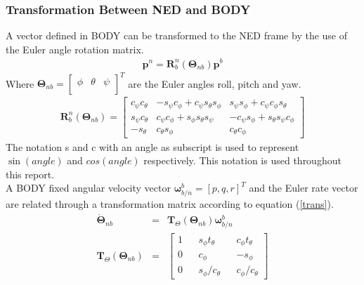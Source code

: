 \subsubsection{Transformation Between NED and BODY}
A vector defined in BODY can be transformed to the NED frame by the use of the Euler angle rotation matrix.
\begin{eqnarray}
\boldsymbol{p}^n = \boldsymbol{R}_b^n(\boldsymbol{\Theta}_{nb})\boldsymbol{p}^b
\end{eqnarray}
Where $\boldsymbol{\Theta}_{nb} = \begin{bmatrix}
\phi & \theta & \psi\\
\end{bmatrix}^T$ are the Euler angles roll, pitch and yaw. 
\begin{eqnarray}
\boldsymbol{R} _b^n(\boldsymbol{\Theta}_{nb}) = 
\begin{bmatrix}
c_\psi c_\theta & -s_\psi c_\phi + c_\psi s_\theta s_\phi & s_\psi s_\phi + c_\psi c_\phi s_\theta\\
s_\psi c_\theta & c_\psi c_\phi + s_\phi s_\theta s_\psi & -c_\psi s_\phi + s_\theta s_\psi c_\phi\\
-s_\theta & c_\theta s_\phi & c_\theta c_\phi
\end{bmatrix}
\label{R_ned}
\end{eqnarray}
The notation s and c with an angle as subscript is used to represent $\sin (angle)$ and $cos (angle)$ respectively. This notation is used throughout this report.\\
\newline
A BODY fixed angular velocity vector $\boldsymbol{\omega}_{b/n}^b = [p, q, r]^T$ and the Euler rate vector are related through a transformation matrix according to equation (\ref{trans}).
\begin{eqnarray}
\dot{\boldsymbol{\Theta}}_{nb} &=& \boldsymbol{T}_\Theta(\boldsymbol{\Theta}_{nb})\boldsymbol{\omega}_{b/n}^b\\
\boldsymbol{T}_\Theta(\boldsymbol{\Theta}_{nb}) &=& \begin{bmatrix}
1 && s_\phi t_\theta && c_\phi t_\theta\\
0 && c_\phi && -s_\phi\\
0 && s_\phi / c_\theta && c_\phi / c_\theta
\end{bmatrix}  
\label{trans}
\end{eqnarray}
